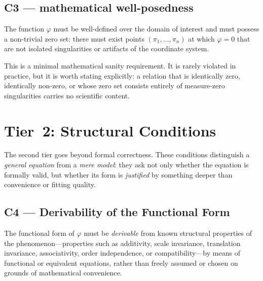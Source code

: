 \subsection{C3 --- mathematical well-posedness}

\begin{condbox}
\begin{condition}
  \label{cond:ucq:wellposed}
The function $\varphi$ must be well-defined over the domain of
interest and must possess a non-trivial zero set: there must exist
points $(\pi_1,\ldots,\pi_n)$ at which $\varphi=0$ that are not
isolated singularities or artifacts of the coordinate system.
\end{condition}
\end{condbox}

This is a minimal mathematical sanity requirement.  It is rarely
violated in practice, but it is worth stating explicitly: a
relation that is identically zero, identically non-zero, or whose
zero set consists entirely of measure-zero singularities carries no
scientific content.

\section{Tier~2: Structural Conditions}
\label{sec:ucq:tier2}

The second tier goes beyond formal correctness.  These conditions
distinguish a \emph{general equation} from a \emph{mere model}:
they ask not only whether the equation is formally valid, but
whether its form is \emph{justified} by something deeper than
convenience or fitting quality.

\subsection{C4 --- Derivability of the Functional Form}

\begin{condbox}
\begin{condition}
  \label{cond:ucq:derive}
The functional form of $\varphi$ must be \emph{derivable} from known
structural properties of the phenomenon---properties such as
additivity, scale invariance, translation invariance,
associativity, order independence, or compatibility---by means of
functional or equivalent equations, rather than freely assumed or chosen on
grounds of mathematical convenience.
\end{condition}
\end{condbox}

